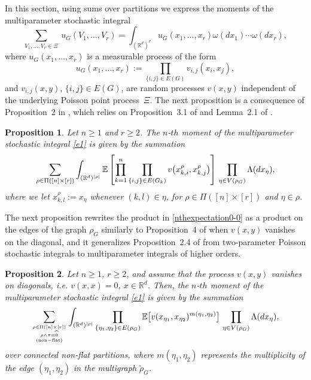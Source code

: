 \documentclass[12pt]{article}
\newcommand{\R}{\mathbb{R}}
\newcommand{\E}{\mathbb{E}}
\newtheorem{prop}{Proposition}[section]
\def\real{{\mathord{\mathbb R}}}
\numberwithin{equation}{section}
\begin{document}
 In this section, using sums over partitions
 we express the moments of the multiparameter stochastic integral 
\begin{equation}
\label{e1}
 \sum_{V_1,\dots,V_r \in\Xi} \ u_G (V_1,\ldots , V_r ) 
 = \int_{(\real^d)^r} u_G (x_1,\ldots , x_r ) \omega (dx_1)\cdots \omega (dx_r), 
\end{equation} 
 where $u_G (x_1,\ldots , x_r )$ is a measurable process of the form 
$$
 u_G (x_1,\ldots , x_r ) := \prod_{\{i,j\} \in E(G)} v_{i,j}(x_i,x_j), 
$$
 and $v_{i,j}(x,y)$, $\{i,j\}\in E(G)$,
 are random processes $v(x,y)$
 independent of the underlying Poisson point process~$\Xi$. 
 The next proposition is a consequence of Proposition~2 in \cite{prkhp}, 
which relies on Proposition~3.1 of \cite{momentpoi} %
and Lemma~2.1 of \cite{bogdan}. 
\begin{prop}
\label{p01-1-0} 
Let $n \geq 1$ and $r\geq 2$. 
The $n$-$th$ moment of the multiparameter stochastic integral
 \eqref{e1} is given by the summation 
\begin{equation} 
\label{nthexpectation0-0} 
\sum_{\rho \in \Pi ( [n] \times [r] )}
\int_{(\R^d )^{|\rho |}}
\E \left[
  \prod_{k=1}^n
\prod_{%
\{i,j\}\in E(G_k)}
v\big(x^\rho_{k,i},x^\rho_{k,j}\big) %
\right] 
   \ \! \prod_{\eta \in V(\rho_G)}
   \Lambda(dx_\eta ),
\end{equation}
 where we let $x_{k,l}^\rho:=x_\eta$ whenever $(k,l)\in \eta$,
 for $\rho \in \Pi([n]\times [r])$ and $\eta\in\rho$.
\end{prop}
 The next proposition rewrites the product in \eqref{nthexpectation0-0} 
 as a product on the edges of the graph $\rho_G$ 
 similarly to Proposition~4 of \cite{prkhp} when $v(x,y)$ vanishes on
 the diagonal, and it generalizes
 Proposition~2.4 of \cite{jansen}
 from two-parameter Poisson stochastic
 integrals to multiparameter integrals of higher orders. 
\begin{prop}
\label{p01-1-4} 
Let $n \geq 1$, $r\geq 2$, and assume that the process $v(x,y)$ vanishes
on diagonals, i.e. $v(x,x) = 0$, $x\in \real^d$. 
Then, the $n$-$th$ moment of the multiparameter stochastic integral
 \eqref{e1} is given by the summation 
\begin{equation} 
\nonumber %
\sum_{\rho \in \Pi ( [n] \times [r] )
\atop {
    \rho \wedge \pi = \widehat{0}
    \atop
        {\rm (non-flat)}
}
}
\int_{(\R^d )^{|\rho |}}
  \prod_{\{\eta_1,\eta_2\} \in E(\rho_G)}
 \E \big[ v(x_{\eta_1},x_{\eta_2})^{m({\eta_1,\eta_2})} \big] 
   \ \! \prod_{\eta \in V(\rho_G)}
\Lambda(dx_\eta ), 
\end{equation} 
over connected non-flat partitions,
where $m ({\eta_1,\eta_2})$ represents the multiplicity of the edge
$(\eta_1,\eta_2)$ in the multigraph $\widetilde{\rho}_G$. 
\end{prop}
\end{document}
